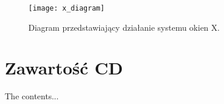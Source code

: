 \begin{appendices}
\begin{description}
\begin{figure}[H]
\begin{center}
    \texttt{[image: x\_diagram]}
\end{center}
\caption{Diagram przedstawiający działanie systemu okien X.}
\label{fig:x_diagram}
\end{figure}
	
\end{description}

\newpage
\section{Zawartość CD}

The contents...

\end{appendices}
